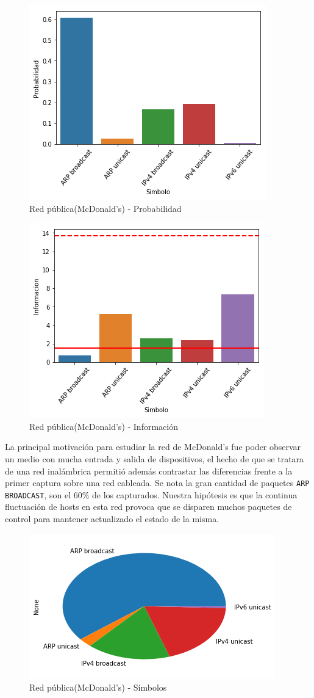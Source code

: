 \begin{figure}[H]
	\centering
	\includegraphics[width=.5\linewidth]{imagenes/mac_barras_prob}
	\caption{Red pública(McDonald's) - Probabilidad}
\end{figure}

\begin{figure}[H]
	\centering
	\includegraphics[width=.5\linewidth]{imagenes/mac_barras_info}
	\caption{Red pública(McDonald's) - Información}
\end{figure}

La principal motivación para estudiar la red de McDonald's fue poder observar un medio con mucha entrada y salida de dispositivos, el hecho de que se tratara de una red inalámbrica permitió además contrastar las diferencias frente a la primer captura sobre una red cableada. Se nota la gran cantidad de paquetes \texttt{ARP BROADCAST}, son el 60\% de los capturados. Nuestra hipótesis es que la continua fluctuación de hosts en esta red provoca que se disparen muchos paquetes de control para mantener actualizado el estado de la misma.

\begin{figure}[H]
	\centering
	\includegraphics[width=.5\linewidth]{imagenes/mac_torta_simbolos}
	\caption{Red pública(McDonald's) - Símbolos}
\end{figure}

